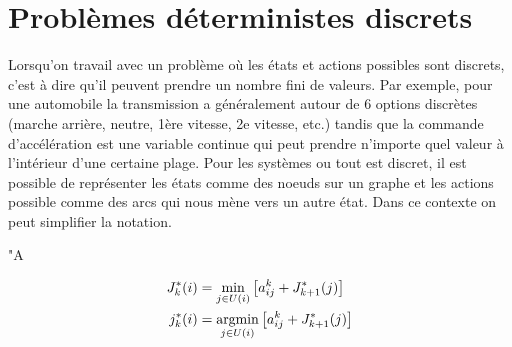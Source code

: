 \newpage
\section{Problèmes déterministes discrets}
Lorsqu'on travail avec un problème où les états et actions possibles sont discrets, c'est à dire qu'il peuvent prendre un nombre fini de valeurs. Par exemple, pour une automobile la transmission a généralement autour de 6 options discrètes (marche arrière, neutre, 1ère vitesse, 2e vitesse, etc.) tandis que la commande d'accélération est une variable continue qui peut prendre n'importe quel valeur à l'intérieur d'une certaine plage. Pour les systèmes ou tout est discret, il est possible de représenter les états comme des noeuds sur un graphe et les actions possible comme des arcs qui nous mène vers un autre état. Dans ce contexte on peut simplifier la notation.

"A

\begin{align}
J^*_k(i) &= 
\operatornamewithlimits{min}\limits_{j \in U(i)}
\left[
a_{ij}^k + J^*_{k+1}(j)
\right] \\
j^*_k(i) &= 
\operatornamewithlimits{argmin}\limits_{j \in U(i)}
\left[
a_{ij}^k + J^*_{k+1}(j)
\right] 
\label{eq:exactdpgraph}
\end{align} 
